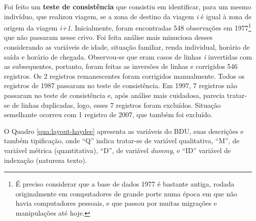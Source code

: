 Foi feito um \textbf{teste de consistência} que consistiu em identificar, para um mesmo indivíduo, que realizou viagem, se a zona de destino da viagem \textit{i} é igual à zona de origem da viagem \textit{i+1}. Inicialmente, foram encontradas 548 observações em 1977\footnote{É preciso considerar que a base de dados 1977 é bastante antiga, rodada originalmente em computadores de grande porte numa época em que não havia computadores pessoais, e que passou por muitas migrações e manipulações até hoje.} que não passaram nesse crivo.  Foi feita análise mais minuciosa desses considerando as variáveis de idade, situação familiar, renda individual, horário de saída e horário de chegada. Observou-se que eram casos de linhas \textit{i} invertidas com as subsequentes, portanto, foram feitas as inversões de linhas e corrigidos 546 registros. Os 2 registros remanescentes foram corrigidos manualmente. Todos os registros de 1987 passaram no teste de consistência. Em 1997, 7 registros não passaram no teste de consistência e, após análise mais cuidadosa, parecia tratar-se de linhas duplicadas, logo, esses 7 registros foram excluídos. Situação semelhante ocorreu com 1 registro de 2007, que também foi excluído.

O Quadro \ref{qua:layout-haydee} apresenta as variáveis do BDU, suas descrições e também tipificação, onde ``Q'' indica tratar-se de variável qualitativa, ``M'', de variável métrica (quantitativa), ``D'', de variável \textit{dummy}, e ``ID'' variável de indexação (natureza texto).

\newcommand{\layoutTamColA}{0.75cm}
\newcommand{\layoutTamColB}{3.20cm}
\newcommand{\layoutTamColC}{4.20cm}
\newcommand{\layoutTamColD}{0.90cm}
\newcommand{\layoutTamColE}{4.50cm}
\newcommand{\layoutColA}[2]{%
	\multicolumn{1}{|c|}{\multirow{#1}{\layoutTamColA}{\centering#2}}%
}
\newcommand{\layoutColB}[2]{\multicolumn{1}{c|}{\multirow{#1}{\layoutTamColB}{\centering#2}}}
\newcommand{\layoutColC}[2]{\multicolumn{1}{c|}{\multirow{#1}{\layoutTamColC}{\centering#2}}}
\newcommand{\layoutColD}[2]{\multicolumn{1}{c|}{\multirow{#1}{\layoutTamColD}{\centering#2}}}

